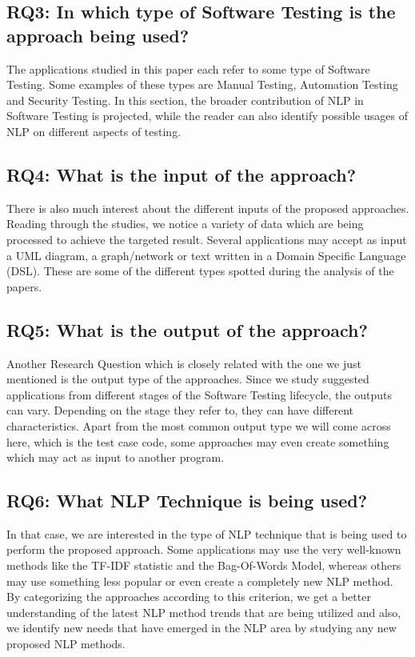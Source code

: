 \subsection {RQ3: In which type of Software Testing is the approach being used?}
The applications studied in this paper each refer to some type of Software Testing. Some examples of these types are Manual Testing, Automation Testing and Security Testing. 
In this section, the broader contribution of NLP in Software Testing is projected, while the reader can also identify possible usages of NLP on different aspects of testing.

\subsection {RQ4: What is the input of the approach?}
There is also much interest about the different inputs of the proposed approaches. Reading through the studies, we notice a variety of data which are 
being processed to achieve the targeted result. Several applications may accept as input a UML diagram, a graph/network or text written in a Domain Specific 
Language (DSL). These are some of the different types spotted during the analysis of the papers.

\subsection {RQ5: What is the output of the approach?}
Another Research Question which is closely related with the one we just mentioned is the output type of the approaches. Since we study suggested applications 
from different stages of the Software Testing lifecycle, the outputs can vary. Depending on the stage they refer to, they can have different characteristics. 
Apart from the most common output type we will come across here, which is the test case code, some approaches may even create something which may act as 
input to another program.

\subsection {RQ6: What NLP Technique is being used?}
In that case, we are interested in the type of NLP technique that is being used to perform the proposed approach. Some applications may use the very well-known methods 
like the TF-IDF statistic and the Bag-Of-Words Model, whereas others may use something less popular or even create a completely new NLP method. By categorizing the approaches 
according to this criterion, we get a better understanding of the latest NLP method trends that are being utilized and also, we identify new needs that have emerged in the 
NLP area by studying any new proposed NLP methods.

